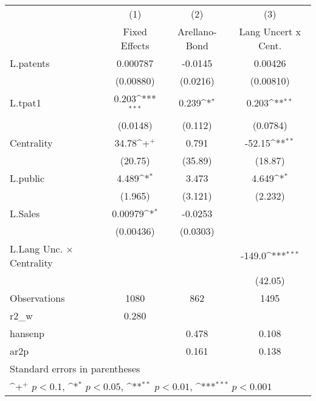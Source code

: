 {
\def\sym#1{\ifmmode^{#1}\else\(^{#1}\)\fi}
\begin{tabular}{l*{3}{c}}
\hline\hline
                    &\multicolumn{1}{c}{(1)}&\multicolumn{1}{c}{(2)}&\multicolumn{1}{c}{(3)}\\
                    &\multicolumn{1}{c}{Fixed Effects}&\multicolumn{1}{c}{Arellano-Bond}&\multicolumn{1}{c}{Lang Uncert x Cent.}\\
\hline
L.patents           &    0.000787         &     -0.0145         &     0.00426         \\
                    &   (0.00880)         &    (0.0216)         &   (0.00810)         \\
L.tpat1             &       0.203\sym{***}&       0.239\sym{*}  &       0.203\sym{**} \\
                    &    (0.0148)         &     (0.112)         &    (0.0784)         \\
Centrality          &       34.78\sym{+}  &       0.791         &      -52.15\sym{**} \\
                    &     (20.75)         &     (35.89)         &     (18.87)         \\
L.public            &       4.489\sym{*}  &       3.473         &       4.649\sym{*}  \\
                    &     (1.965)         &     (3.121)         &     (2.232)         \\
L.Sales             &     0.00979\sym{*}  &     -0.0253         &                     \\
                    &   (0.00436)         &    (0.0303)         &                     \\
L.Lang Unc. $\times$ Centrality&                     &                     &      -149.0\sym{***}\\
                    &                     &                     &     (42.05)         \\
\hline
Observations        &        1080         &         862         &        1495         \\
r2\_w                &       0.280         &                     &                     \\
hansenp             &                     &       0.478         &       0.108         \\
ar2p                &                     &       0.161         &       0.138         \\
\hline\hline
\multicolumn{4}{l}{\footnotesize Standard errors in parentheses}\\
\multicolumn{4}{l}{\footnotesize \sym{+} \(p<0.1\), \sym{*} \(p<0.05\), \sym{**} \(p<0.01\), \sym{***} \(p<0.001\)}\\
\end{tabular}
}
